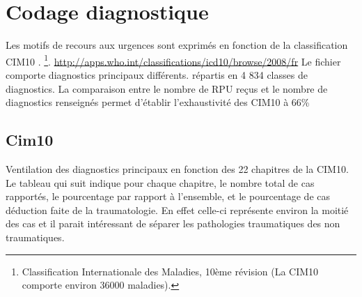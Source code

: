 \documentclass[12pt,english,french,twoside]{book}\usepackage[]{graphicx}\usepackage[]{color}
\begin{document}


\newpage
\chapter{Codage diagnostique}

%




Les motifs de recours aux urgences sont exprimés en fonction de la classification CIM10 \cite{10}.
\footnote{Classification Internationale des Maladies, 10ème révision (La CIM10 comporte environ 36000 maladies).}.
\url{http://apps.who.int/classifications/icd10/browse/2008/fr}
Le fichier comporte  diagnostics principaux différents.
répartis en 4 834 classes de diagnostics.
La comparaison entre le nombre de RPU reçus et le nombre de diagnostics renseignés permet d'établir l'exhaustivité des CIM10 à 66\% 


\section{Cim10}

Ventilation des diagnostics principaux en fonction des 22 chapitres de la CIM10. Le tableau qui suit indique pour chaque chapitre, le nombre total de cas rapportés, le pourcentage par rapport à l'ensemble, et le pourcentage de cas déduction faite de la traumatologie. En effet celle-ci représente environ la moitié des cas et il parait intéressant de séparer les pathologies traumatiques des non traumatiques.





\end{document}
